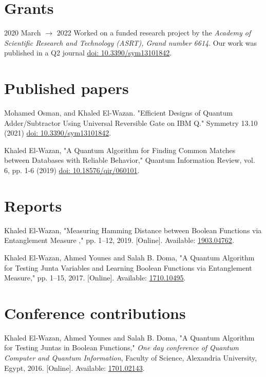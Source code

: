 \documentclass[margin,line,a4paper]{resume}
\newcommand*{\doi}[1]{\href{http://dx.doi.org/#1}{doi: #1}}
\begin{document}
\begin{resume}
\begin{description}
    \end{description}

\section{\mysidestyle Grants}

    2020 March $\rightarrow$ 2022 Worked on a funded research project by the \textit{Academy of Scientific Research and Technology (ASRT), Grand number 6614}. Our work was published in a Q2 journal \doi{10.3390/sym13101842}.



\section{ \mysidestyle Published papers}

Mohamed Osman, and Khaled El-Wazan. "Efficient Designs of Quantum Adder/Subtractor Using Universal Reversible Gate on IBM Q." Symmetry 13.10 (2021) \doi{10.3390/sym13101842}.
    
    
Khaled El-Wazan, "A Quantum Algorithm for Finding Common Matches between Databases with Reliable Behavior," Quantum Information Review, vol. 6, pp. 1-6 (2019) \doi{10.18576/qir/060101}.


\section{\mysidestyle Reports}

Khaled El-Wazan, "Measuring Hamming Distance between Boolean Functions via Entanglement Measure ,"  pp. 1--12, 2019. 
[Online]. Available: \href{http://arxiv.org/abs/1903.04762}{1903.04762}.



Khaled El-Wazan, Ahmed Younes and Salah B. Doma, "A Quantum Algorithm for Testing Junta Variables and Learning Boolean Functions via Entanglement Measure,"  pp. 1--15, 2017. 
[Online]. Available: \href{http://arxiv.org/abs/1710.10495}{1710.10495}.



\section{ \mysidestyle Conference contributions}


Khaled El-Wazan, Ahmed Younes and Salah B. Doma, "A Quantum Algorithm for Testing Juntas in Boolean Functions," \textit{One day conference of Quantum Computer and Quantum Information}, Faculty of Science, Alexandria University, Egypt, 2016. [Online]. Available: \href{http://arxiv.org/abs/1701.02143}{1701.02143}.



\end{resume}
\end{document}
